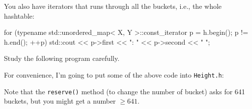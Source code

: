 You also have iterators that runs through all the buckets, i.e., the whole hashtable:
\begin{console}[fontsize=\footnotesize]
for (typename std::unordered_map< X, Y >::const_iterator p = h.begin();
     p != h.end(); ++p)
{
    std::cout << p->first << ": " << p->second << "  ";
}
\end{console}

Study the following program carefully.


\vspace{-0.1cm}
{\small
{}
}

For convenience, I'm going to put some of the above code
into \verb!Height.h!:


\vspace{-0.1cm}
{\small
{}
}

Note that the \verb!reserve()! method (to change the number of
bucket) asks for 641 buckets, but you might get a number $\geq 641$.






